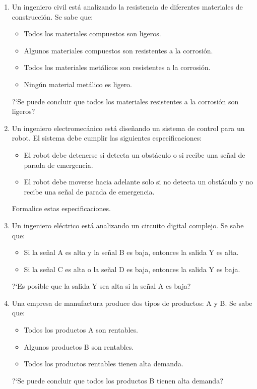 \begin{enumerate}[label=\textbf{\arabic*}.]
	\begin{enumerate}
		\item Un ingeniero civil está analizando la resistencia de diferentes materiales de construcción. Se sabe que:
		\begin{itemize}[itemsep=-3pt]
			\item Todos los materiales compuestos son ligeros.
			\item Algunos materiales compuestos son resistentes a la corrosión.
			\item Todos los materiales metálicos son resistentes a la corrosión.
			\item Ningún material metálico es ligero.
		\end{itemize}
		
		?`Se puede concluir que todos los materiales resistentes a la corrosión son ligeros?
		
		\item Un ingeniero electromecánico está diseñando un sistema de control para un robot. El sistema debe cumplir las siguientes especificaciones:
		\begin{itemize}[itemsep=-3pt]
			\item El robot debe detenerse si detecta un obstáculo o si recibe una señal de parada de emergencia.
			\item El robot debe moverse hacia adelante solo si no detecta un obstáculo y no recibe una señal de parada de emergencia.
		\end{itemize}
		Formalice estas especificaciones.
		
		\item Un ingeniero eléctrico está analizando un circuito digital complejo. Se sabe que:
		\begin{itemize}[itemsep=-3pt]
			\item Si la señal A es alta y la señal B es baja, entonces la salida Y es alta.
			\item Si la señal C es alta o la señal D es baja, entonces la salida Y es baja.
		\end{itemize}
		?`Es posible que la salida Y sea alta si la señal A es baja?
		
		\item Una empresa de manufactura produce dos tipos de productos: A y B. Se sabe que:
		
		\begin{itemize}[itemsep=-3pt]
			\item Todos los productos A son rentables.
			\item Algunos productos B son rentables.
			\item Todos los productos rentables tienen alta demanda.
		\end{itemize}
		?`Se puede concluir que todos los productos B tienen alta demanda?
		

\end{enumerate}
\end{enumerate}

